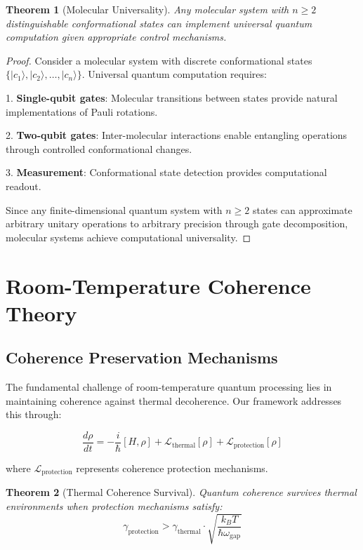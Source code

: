 \documentclass[12pt]{article}
\newtheorem{theorem}{Theorem}[section]
\begin{document}
\begin{theorem}[Molecular Universality]
Any molecular system with $n \geq 2$ distinguishable conformational states can implement universal quantum computation given appropriate control mechanisms.
\end{theorem}

\begin{proof}
Consider a molecular system with discrete conformational states $\{|c_1\rangle, |c_2\rangle, \ldots, |c_n\rangle\}$. Universal quantum computation requires:

1. \textbf{Single-qubit gates}: Molecular transitions between states provide natural implementations of Pauli rotations.

2. \textbf{Two-qubit gates}: Inter-molecular interactions enable entangling operations through controlled conformational changes.

3. \textbf{Measurement}: Conformational state detection provides computational readout.

Since any finite-dimensional quantum system with $n \geq 2$ states can approximate arbitrary unitary operations to arbitrary precision through gate decomposition, molecular systems achieve computational universality.
\end{proof}

\section{Room-Temperature Coherence Theory}

\subsection{Coherence Preservation Mechanisms}

The fundamental challenge of room-temperature quantum processing lies in maintaining coherence against thermal decoherence. Our framework addresses this through:

\begin{equation}
\frac{d\rho}{dt} = -\frac{i}{\hbar}[H, \rho] + \mathcal{L}_{\text{thermal}}[\rho] + \mathcal{L}_{\text{protection}}[\rho]
\end{equation}

where $\mathcal{L}_{\text{protection}}$ represents coherence protection mechanisms.

\begin{theorem}[Thermal Coherence Survival]
Quantum coherence survives thermal environments when protection mechanisms satisfy:
\begin{equation}
\gamma_{\text{protection}} > \gamma_{\text{thermal}} \cdot \sqrt{\frac{k_B T}{\hbar\omega_{\text{gap}}}}
\end{equation}
\end{theorem}
\end{document}
